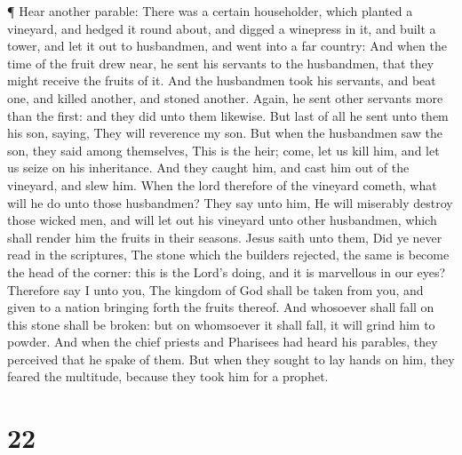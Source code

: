  ¶ Hear another parable: There was a certain householder,
which planted a vineyard, and hedged it round about, and digged a
winepress in it, and built a tower, and let it out to husbandmen, and
went into a far country:  And when the time of the fruit
drew near, he sent his servants to the husbandmen, that they might
receive the fruits of it.  And the husbandmen took his
servants, and beat one, and killed another, and stoned another.
 Again, he sent other servants more than the first: and
they did unto them likewise.  But last of all he sent unto
them his son, saying, They will reverence my son.  But when
the husbandmen saw the son, they said among themselves, This is the
heir; come, let us kill him, and let us seize on his inheritance.
 And they caught him, and cast him out of the vineyard, and
slew him.  When the lord therefore of the vineyard cometh,
what will he do unto those husbandmen?  They say unto him,
He will miserably destroy those wicked men, and will let out his
vineyard unto other husbandmen, which shall render him the fruits in
their seasons.  Jesus saith unto them, Did ye never read in
the scriptures, The stone which the builders rejected, the same is
become the head of the corner: this is the Lord's doing, and it is
marvellous in our eyes?  Therefore say I unto you, The
kingdom of God shall be taken from you, and given to a nation bringing
forth the fruits thereof.  And whosoever shall fall on this
stone shall be broken: but on whomsoever it shall fall, it will grind
him to powder.  And when the chief priests and Pharisees
had heard his parables, they perceived that he spake of them.
 But when they sought to lay hands on him, they feared the
multitude, because they took him for a prophet.

\hypertarget{section-21}{%
\section{22}\label{section-21}}

